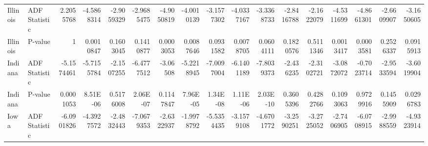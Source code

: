 \begin{table}
{\begin{tabular}{llrrrrrrrrrrrrrrr}
            Illinois    & ADF Statistic & 2.2055768                           & -4.5868314               & -2.9059329               & -2.9685475               & -4.9050819                 & -4.0010139               & -3.1577302                 & -4.0337167              & -3.3368733              & -2.8416788                 & -2.1622079                 & -4.5311699                & -4.8661301                & -2.6609907                       & -3.1650605                       \\
            Illinois    & P-value       & 1                                   & 0.0010847                & 0.1603045                & 0.1410877                & 0.0003053                  & 0.0087646                & 0.0931582                  & 0.0078705               & 0.0604111               & 0.1820576                  & 0.5111346                  & 0.0013417                 & 0.0003581                 & 0.2526337                        & 0.0915913                        \\
            Indiana     & ADF Statistic & -5.1574461                          & -5.7155784               & -2.1507255               & -6.4777512               & -3.06508                   & -5.2218945               & -7.0097004                 & -6.1401189              & -7.8039373              & -2.436235                  & -2.3102721                 & -3.0872072                & -0.7023714                & -2.9533594                       & -3.6019904                       \\
            Indiana     & P-value       & 0.0001053                           & 8.51E-06                 & 0.5176008                & 2.06E-07                 & 0.1147847                  & 7.96E-05                 & 1.34E-08                   & 1.11E-06                & 2.03E-10                & 0.3605396                  & 0.4282766                  & 0.1093063                 & 0.9729916                 & 0.1455909                        & 0.0296783                        \\
            Iowa        & ADF Statistic & -6.0901826                          & -4.3927572               & -2.4832443               & -7.0679353               & -2.6322937                 & -1.9978792               & -5.5354435                 & -3.1579108              & -4.6701772              & -3.2590251                 & -3.2725052                 & -2.7406905                & -6.0708915                & -2.9988559                       & -4.9323914                       \\

\end{tabular}}
\end{table}
